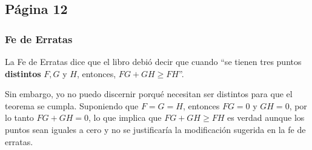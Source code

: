 

\subsection{Página 12}

\subsubsection{Fe de Erratas}

La Fe de Erratas dice que el libro debió decir que cuando ``se tienen tres puntos \textbf{distintos} \(F, G\) y \(H\), entonces, \(FG + GH \ge FH\)''. 

Sin embargo, yo no puedo discernir porqué necesitan ser distintos para que el teorema se cumpla. Suponiendo que \(F = G = H\), entonces \(FG =0\) y \(GH = 0\), por lo tanto \(FG + GH = 0\), lo que implica que \(FG + GH \ge FH\) es verdad aunque los puntos sean iguales a cero y no se justificaría la modificación sugerida en la fe de erratas.






